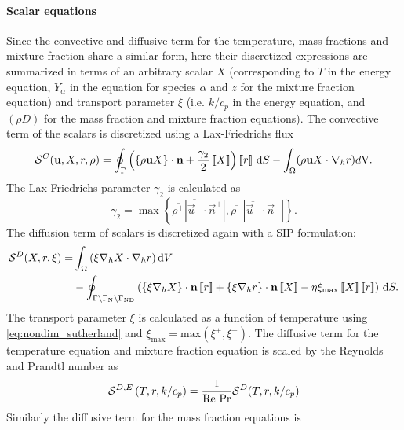\paragraph{Scalar equations}
Since the convective and diffusive term for the temperature, mass fractions and mixture fraction share a similar form,  here their discretized expressions are summarized in terms of an arbitrary scalar $X$ (corresponding to $T$ in the energy equation, $Y_\alpha$ in the equation for species $\alpha$ and $z$ for the mixture fraction equation) and transport parameter $\xi$ (i.e. $k/c_p$ in the energy equation, and $(\rho D)$ for the mass fraction and mixture fraction equations). The convective term of the scalars is discretized using a Lax-Friedrichs flux
\begin{equation}
	\mathcal{S}^C(\textbf{u},X,r, \rho) =  \oint_{\Gamma}{\left( \left\{{\rho\textbf{u}X }\right\}\cdot \textbf{n} + \frac{\gamma_2}{2}\left[\!\left[{{X}}\right]\!\right]\right)\left[\!\left[{{r}}\right]\!\right] \,\mathrm{d} S}
	- \int_{\Omega}({\rho \textbf{u} X \cdot \nabla_h r) d\text{V}}. \label{eq:scalar_convective}
\end{equation}
The Lax-Friedrichs parameter $\gamma_2$ is calculated as 
\begin{equation}
	\gamma_2  = \max \left\{\overline{\rho^+} |\overline{\vec{u}^+} \cdot \vec{n}^+|,\overline{\rho^-} |\overline{\vec{u}^-} \cdot \vec{n}^-|\right\}.
	\label{eq:vardens_lambda2}
\end{equation}
The diffusion term of scalars is discretized again with a SIP formulation:
\begin{align}
	\mathcal{S}^D(X,r,\xi)= & \int_{\Omega}{ \left(\xi \nabla_h X \cdot\nabla_h r\right) }\dV \notag         \\
	                        & -\oint_{\Gamma \setminus \Gamma_{\text{N}}\setminus \Gamma_{\text{ND}}}{\left(
		\mean{\xi \nabla_h X}\cdot \vec{n}\jump{r} +
		\mean{\xi \nabla_h r}\cdot \vec{n}\jump{X} -
		\eta \xi_{\text{max}} \jump{X} \jump{r}
		\right) \dS.
	} \label{eq:Temp_diffusive}
\end{align}
The transport parameter $\xi$ is calculated as a function of temperature using \cref{eq:nondim_sutherland} and $\xi_{\text{max}} = \text{max}(\xi^{+}, \xi^{-})$.
The diffusive term for the temperature equation  and mixture fraction equation is scaled by the Reynolds and Prandtl number as
\begin{equation}
\mathcal{S}^{D,E}\left(T,r,k/c_p\right) = \frac{1}{\text{Re}~\text{Pr}} \mathcal{S}^D(T,r,k/c_p)
\end{equation}
Similarly the diffusive term for the mass fraction equations is
